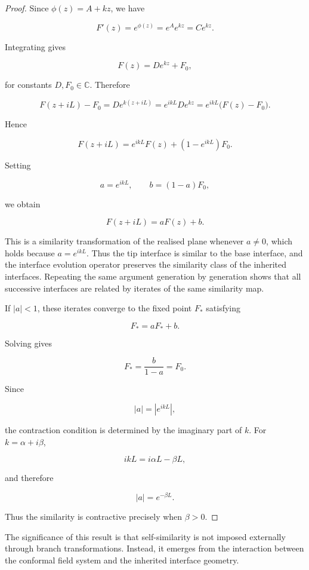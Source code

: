 \documentclass[11pt,a4paper]{article}
\begin{document}
\begin{proof}
Since $\phi(z)=A+kz$, we have

\[
    F'(z)=e^{\phi(z)}=e^A e^{kz}=Ce^{kz}.
\]

Integrating gives

\[
    F(z)=De^{kz}+F_0,
\]

for constants $D,F_0\in\mathbb{C}$. Therefore

\[
    F(z+iL)-F_0
    =
    De^{k(z+iL)}
    =
    e^{ikL}De^{kz}
    =
    e^{ikL}\bigl(F(z)-F_0\bigr).
\]

Hence

\[
    F(z+iL)
    =
    e^{ikL}F(z)+(1-e^{ikL})F_0.
\]

Setting

\[
    a=e^{ikL},
    \qquad
    b=(1-a)F_0,
\]

we obtain

\[
    F(z+iL)=aF(z)+b.
\]

This is a similarity transformation of the realised plane whenever
$a\neq 0$, which holds because $a=e^{ikL}$. Thus the tip interface is
similar to the base interface, and the interface evolution operator
preserves the similarity class of the inherited interfaces. Repeating
the same argument generation by generation shows that all successive
interfaces are related by iterates of the same similarity map.

If $|a|<1$, these iterates converge to the fixed point $F_*$ satisfying

\[
    F_*=aF_*+b.
\]

Solving gives

\[
    F_*=\frac{b}{1-a}=F_0.
\]

Since

\[
    |a|=|e^{ikL}|,
\]

the contraction condition is determined by the imaginary part of $k$.
For $k=\alpha+i\beta$,

\[
    ikL=i\alpha L-\beta L,
\]

and therefore

\[
    |a|=e^{-\beta L}.
\]

Thus the similarity is contractive precisely when $\beta>0$.
\end{proof}

The significance of this result is that self-similarity is not imposed
externally through branch transformations. Instead, it emerges from
the interaction between the conformal field system and the inherited
interface geometry.
\end{document}
